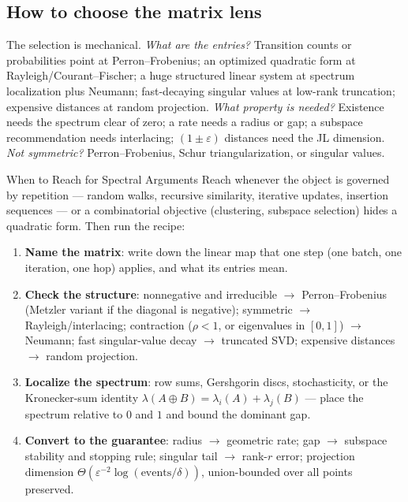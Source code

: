\subsection{How to choose the matrix lens}
\label{sec:spec-choose}

The selection is mechanical. \emph{What are the entries?} Transition counts
or probabilities point at Perron--Frobenius; an optimized quadratic form at
Rayleigh/Courant--Fischer; a huge structured linear system at spectrum
localization plus Neumann; fast-decaying singular values at low-rank
truncation; expensive distances at random projection. \emph{What property is
needed?} Existence needs the spectrum clear of zero; a rate needs a radius
or gap; a subspace recommendation needs interlacing; $(1\pm\varepsilon)$
distances need the JL dimension. \emph{Not symmetric?} Perron--Frobenius, Schur triangularization, or singular values.

\begin{reachbox}{When to Reach for Spectral Arguments}
Reach whenever the object is governed by repetition --- random walks,
recursive similarity, iterative updates, insertion sequences --- or a
combinatorial objective (clustering, subspace selection) hides a quadratic
form. Then run the recipe:
\begin{enumerate}
\item \textbf{Name the matrix}: write down the linear map that one step (one
  batch, one iteration, one hop) applies, and what its entries mean.
\item \textbf{Check the structure}: nonnegative and irreducible $\to$
  Perron--Frobenius (Metzler variant if the diagonal is negative); symmetric
  $\to$ Rayleigh/interlacing; contraction ($\rho < 1$, or eigenvalues in
  $[0,1]$) $\to$ Neumann; fast singular-value decay $\to$ truncated SVD;
  expensive distances $\to$ random projection.
\item \textbf{Localize the spectrum}: row sums, Gershgorin discs,
  stochasticity, or the Kronecker-sum identity $\lambda(A \oplus B) =
  \lambda_i(A) + \lambda_j(B)$ --- place the spectrum relative to $0$ and
  $1$ and bound the dominant gap.
\item \textbf{Convert to the guarantee}: radius $\to$ geometric rate; gap
  $\to$ subspace stability and stopping rule; singular tail $\to$ rank-$r$
  error; projection dimension $\Theta(\varepsilon^{-2}\log(
  \text{events}/\delta))$, union-bounded over all points preserved.
\end{enumerate}
\end{reachbox}

